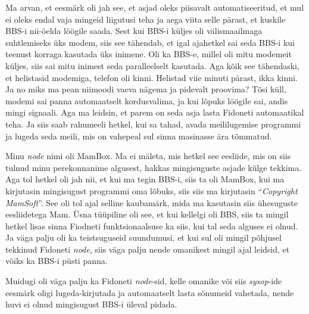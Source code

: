 Ma arvan, et eesmärk oli jah see, et asjad oleks piisavalt automatiseeritud, et 
mul ei oleks endal vaja mingeid liigutusi teha  ja aega viita selle pärast, et 
kuskile BBS-i nii-öelda löögile saada. Sest kui BBS-i küljes oli  
välismaailmaga suhtlemiseks üks modem, siis see tähendab, et igal ajahetkel sai 
seda BBS-i kui teenust korraga kasutada üks inimene. Oli ka BBS-e, millel oli mitu 
modemeit küljes, siis sai mitu inimest seda paralleelselt kasutada.  Aga kõik 
see tähendaski, et helistasid modemiga, telefon oli kinni. Helistad viie minuti 
pärast, ikka kinni. Ja no miks ma pean niimoodi vaeva nägema ja pidevalt 
proovima? Tõsi küll, modemi sai panna automaatselt kordusvalima, 
ja kui lõpuks löögile sai, andis mingi signaali. Aga ma leidsin, et parem on 
seda asja lasta  Fidoneti automaatikal teha. Ja siis  saab  rahumeeli hetkel, 
kui sa tahad, avada meililugemise programmi ja lugeda seda meili, mis on 
vahepeal sul sinna masinasse ära tõmmatud. 


Minu \emph{node} nimi oli MamBox. Ma ei mäleta, mis hetkel see eesliide, mis on 
siis tulnud minu perekonnanime algusest,  hakkas mingisuguste asjade külge 
tekkima. Aga tol hetkel oli jah nii, et kui ma tegin BBS-i, siis ta oli MamBox, 
kui ma kirjutasin mingisugust programmi  oma lõbuks, siis siis ma kirjutasin 
\enquote{\emph{Copyright MamSoft}}. See oli tol ajal selline kaubamärk, mida ma kasutasin siis 
ühesuguste eesliidetega Mam. Üsna tüüpiline oli see, et kui kellelgi oli BBS, siis 
ta mingil hetkel lisas sinna  Fiodneti funktsionaalsuse ka siis, kui tal seda 
alguses ei olnud. Ja väga palju oli ka teistsuguseid suundumusi, et kui sul oli 
mingil põhjusel tekkinud Fidoneti \emph{node}, siis väga palju nende  omanikest 
mingil ajal leidsid, et võiks  ka BBS-i püsti panna. 

Muidugi oli väga palju ka Fidoneti \emph{node}-sid, kelle omanike või siis 
\emph{sysop}-ide eesmärk oligi lugeda-kirjutada ja automaatselt lasta sõnumeid 
vahetada,  nende huvi ei olnud mingisugust BBS-i üleval pidada.


